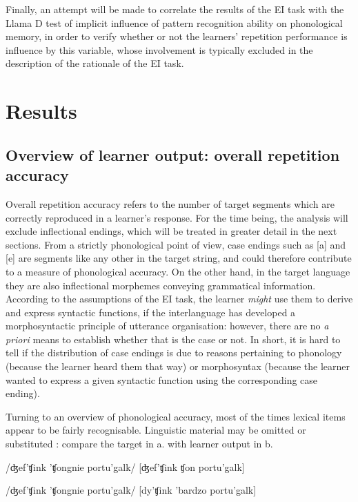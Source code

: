 Finally, an attempt will be made to correlate the results of the EI task with the Llama D test of implicit influence of pattern recognition ability on phonological memory, in order to verify whether or not the learners’ repetition performance is influence by this variable, whose involvement is typically excluded in the description of the rationale of the EI task.

\section{Results}\label{sec:04:2}

\subsection{Overview of learner output: overall repetition accuracy}\label{sec:04:2.1}

Overall repetition accuracy refers to the number of target segments which are correctly reproduced in a learner’s response. For the time being, the analysis will exclude inflectional endings, which will be treated in greater detail in the next sections. From a strictly phonological point of view, case endings such as [a] and [e] are segments like any other in the target string, and could therefore contribute to a measure of phonological accuracy. On the other hand, in the target language they are also inflectional morphemes conveying grammatical information. According to the assumptions of the EI task, the learner \textit{might} use them to derive and express syntactic functions, if the interlanguage has developed a morphosyntactic principle of utterance organisation: however, there are no \textit{a priori} means to establish whether that is the case or not. In short, it is hard to tell if the distribution of case endings is due to reasons pertaining to phonology (because the learner heard them that way) or morphosyntax (because the learner wanted to express a given syntactic function using the corresponding case ending).

Turning to an overview of phonological accuracy, most of the times lexical items appear to be fairly recognisable. Linguistic material may be omitted  or substituted : compare the target in a. with learner output in b. 

\ea%
    \label{ex:04:1}
    \ea\label{ex:04:1a}
    /ʤef'ʧink 'ʧongnie portu'galk/
    \ex\label{ex:04:1b}
    [ʤef'ʧink ʧon portu'galk]
    \z
\z

\ea%
    \label{ex:04:2}
    \ea\label{ex:04:2a}
    /ʤef'ʧink 'ʧongnie portu'galk/
    \ex\label{ex:04:2b}
    [dy'ʧink 'bardzo portu'galk]
    \z
\z


